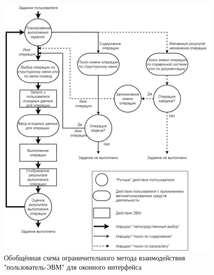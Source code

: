 \begin{figure}[!ht]
  \centering
  \includegraphics[scale=0.8]{ResearchNotes/rndhpc_not_gui_2022_10_10/scheme1.png}
  \caption{Обобщённая схема ограничительного метода взаимодействия "пользователь-ЭВМ" для оконного интерфейса}
  \label{scheme1}
\end{figure}

